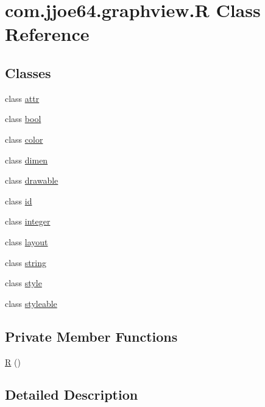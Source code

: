 \hypertarget{classcom_1_1jjoe64_1_1graphview_1_1_r}{}\section{com.\+jjoe64.\+graphview.\+R Class Reference}
\label{classcom_1_1jjoe64_1_1graphview_1_1_r}
\subsection*{Classes}
\begin{DoxyCompactItemize}
\item 
class \mbox{\hyperlink{classcom_1_1jjoe64_1_1graphview_1_1_r_1_1attr}{attr}}
\item 
class \mbox{\hyperlink{classcom_1_1jjoe64_1_1graphview_1_1_r_1_1bool}{bool}}
\item 
class \mbox{\hyperlink{classcom_1_1jjoe64_1_1graphview_1_1_r_1_1color}{color}}
\item 
class \mbox{\hyperlink{classcom_1_1jjoe64_1_1graphview_1_1_r_1_1dimen}{dimen}}
\item 
class \mbox{\hyperlink{classcom_1_1jjoe64_1_1graphview_1_1_r_1_1drawable}{drawable}}
\item 
class \mbox{\hyperlink{classcom_1_1jjoe64_1_1graphview_1_1_r_1_1id}{id}}
\item 
class \mbox{\hyperlink{classcom_1_1jjoe64_1_1graphview_1_1_r_1_1integer}{integer}}
\item 
class \mbox{\hyperlink{classcom_1_1jjoe64_1_1graphview_1_1_r_1_1layout}{layout}}
\item 
class \mbox{\hyperlink{classcom_1_1jjoe64_1_1graphview_1_1_r_1_1string}{string}}
\item 
class \mbox{\hyperlink{classcom_1_1jjoe64_1_1graphview_1_1_r_1_1style}{style}}
\item 
class \mbox{\hyperlink{classcom_1_1jjoe64_1_1graphview_1_1_r_1_1styleable}{styleable}}
\end{DoxyCompactItemize}
\subsection*{Private Member Functions}
\begin{DoxyCompactItemize}
\item 
\mbox{\hyperlink{classcom_1_1jjoe64_1_1graphview_1_1_r_a7be993fb9c843ee7caa4549a95ce8d12}{R}} ()
\end{DoxyCompactItemize}


\subsection{Detailed Description}


